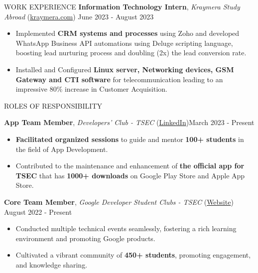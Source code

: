 \documentclass{resume} %
\begin{document}
\begin{rSection}{WORK EXPERIENCE}
\textbf{Information Technology Intern}, \textit{Kraymera Study Abroad} (\href{https://kraymera.com}{kraymera.com})  \hfill June 2023 - August 2023

\begin{itemize}
    \itemsep -6pt {} 
    \item Implemented \textbf{CRM systems and processes} using Zoho and developed WhatsApp Business API automations using Deluge scripting language, boosting lead nurturing process and doubling (2x) the lead conversion rate.
    \item Installed and Configured \textbf{Linux server, Networking devices, GSM Gateway and CTI software} for telecommunication leading to an impressive 80\% increase in Customer Acquisition.
 \end{itemize}
\end{rSection}

\begin{rSection}{ROLES OF RESPONSIBILITY}

\textbf{App Team Member}, \textit{Developers' Club - TSEC} (\href{https://www.linkedin.com/in/developer-s-club-tsec/}{LinkedIn})\hfill March 2023 - Present
 \begin{itemize}
    \itemsep -6pt {} 
    \item \textbf{Facilitated organized sessions} to guide and mentor \textbf{100+ students} in the field of App Development.
    \item Contributed to the maintenance and enhancement of \textbf{the official app for TSEC} that has \textbf{1000+ downloads} on Google Play Store and Apple App Store.
 \end{itemize}

\textbf{Core Team Member}, \textit{Google Developer Student Clubs - TSEC} (\href{https://gdsc.community.dev/thadomal-shahani-engineering-college-mumbai/}{Website})  \hfill August 2022 - Present
 \begin{itemize}
    \itemsep -6pt {} 
    \item Conducted multiple technical events seamlessly, fostering a rich learning environment and promoting Google products.
    \item Cultivated a vibrant community of \textbf{450+ students}, promoting engagement, and knowledge sharing.
 \end{itemize}

\end{rSection} 
\end{document}
